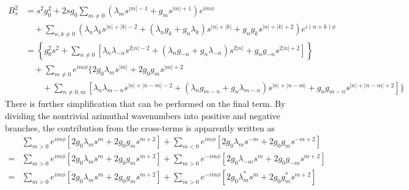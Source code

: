 \documentclass[a4paper, 11pt]{article}
\begin{document}
\begin{equation}
\begin{aligned}
    B_s^2 &= s^2 g_0^2 + 2s g_0 \sum_{m\neq 0} \left(\lambda_m s^{|m|-1} + g_m s^{|m|+1}\right) e^{im\phi} \\
    &\quad + \sum_{n,k\neq 0} \left(\lambda_n \lambda_k s^{|n|+|k|-2} + \left(\lambda_n g_k + g_n \lambda_k\right) s^{|n| + |k|} + g_n g_k s^{|n|+|k|+2} \right) e^{i(n+k)\phi} \\ 
    &= \left\{g_0^2 s^2 + \sum_{n\neq 0} \left[\lambda_n \lambda_{-n} s^{2|n|-2} + \left(\lambda_n g_{-n} + g_n \lambda_{-n}\right) s^{2|n|} + g_n g_{-n}  s^{2|n|+ 2} \right]\right\} \\ 
    &\quad + \sum_{m\neq 0} e^{im\phi} \Bigg\{2g_0 \lambda_m s^{|m|} + 2 g_0 g_m s^{|m|+2} \\
    &\qquad + \sum_{n\neq 0, m} \left[\lambda_n\lambda_{m-n} s^{|n|+|n-m|-2} + \left(\lambda_n g_{m-n} + g_n \lambda_{m-n}\right)s^{|n|+|n-m|} + g_n g_{m-n} s^{|n|+|n-m|+2}\right] \Bigg\}
\end{aligned}
\end{equation}
There is further simplification that can be performed on the final term. By dividing the nontrivial azimuthal wavenumbers into positive and negative branches, the contribution from the cross-terms is apparently written as
\begin{equation}
\begin{aligned}
    &\sum_{m > 0} e^{im\phi} \left[2 g_0 \lambda_m s^m + 2g_0 g_m s^{m+2}\right] + \sum_{m<0} e^{im\phi} \left[2 g_0 \lambda_m s^{-m} + 2g_0 g_m s^{-m+2}\right] \\ 
    =& \sum_{m > 0} e^{im\phi} \left[2 g_0 \lambda_m s^m + 2g_0 g_m s^{m+2}\right] +\sum_{m>0} e^{-im\phi} \left[2 g_0 \lambda_{-m} s^m + 2g_0 g_{-m} s^{m+2}\right] \\
    =& \sum_{m > 0} e^{im\phi} \left[2 g_0 \lambda_m s^m + 2g_0 g_m s^{m+2}\right] +\sum_{m>0} e^{-im\phi} \left[2 g_0 \lambda_m^* s^m + 2g_0 g_m^* s^{m+2}\right]
\end{aligned}
\end{equation}
\end{document}
